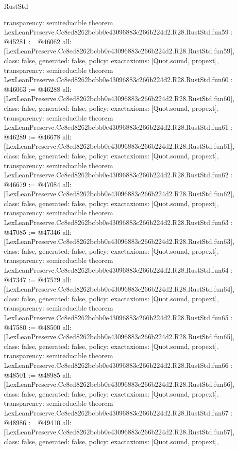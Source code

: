 \begin{lexlean}{RustStd}
\begin{coremodule}
{  transparency: semireducible
}
theorem LexLeanPreserve.Cc8ed8262bcbb0e43096883c266b224d2.R28.RustStd.fun59 : @45281 := @46062 {
  all: [LexLeanPreserve.Cc8ed8262bcbb0e43096883c266b224d2.R28.RustStd.fun59],
  class: false,
  generated: false,
  policy: exact{axioms: [Quot.sound, propext]},
  transparency: semireducible
}
theorem LexLeanPreserve.Cc8ed8262bcbb0e43096883c266b224d2.R28.RustStd.fun60 : @46063 := @46288 {
  all: [LexLeanPreserve.Cc8ed8262bcbb0e43096883c266b224d2.R28.RustStd.fun60],
  class: false,
  generated: false,
  policy: exact{axioms: [Quot.sound, propext]},
  transparency: semireducible
}
theorem LexLeanPreserve.Cc8ed8262bcbb0e43096883c266b224d2.R28.RustStd.fun61 : @46289 := @46678 {
  all: [LexLeanPreserve.Cc8ed8262bcbb0e43096883c266b224d2.R28.RustStd.fun61],
  class: false,
  generated: false,
  policy: exact{axioms: [Quot.sound, propext]},
  transparency: semireducible
}
theorem LexLeanPreserve.Cc8ed8262bcbb0e43096883c266b224d2.R28.RustStd.fun62 : @46679 := @47084 {
  all: [LexLeanPreserve.Cc8ed8262bcbb0e43096883c266b224d2.R28.RustStd.fun62],
  class: false,
  generated: false,
  policy: exact{axioms: [Quot.sound, propext]},
  transparency: semireducible
}
theorem LexLeanPreserve.Cc8ed8262bcbb0e43096883c266b224d2.R28.RustStd.fun63 : @47085 := @47346 {
  all: [LexLeanPreserve.Cc8ed8262bcbb0e43096883c266b224d2.R28.RustStd.fun63],
  class: false,
  generated: false,
  policy: exact{axioms: [Quot.sound, propext]},
  transparency: semireducible
}
theorem LexLeanPreserve.Cc8ed8262bcbb0e43096883c266b224d2.R28.RustStd.fun64 : @47347 := @47579 {
  all: [LexLeanPreserve.Cc8ed8262bcbb0e43096883c266b224d2.R28.RustStd.fun64],
  class: false,
  generated: false,
  policy: exact{axioms: [Quot.sound, propext]},
  transparency: semireducible
}
theorem LexLeanPreserve.Cc8ed8262bcbb0e43096883c266b224d2.R28.RustStd.fun65 : @47580 := @48500 {
  all: [LexLeanPreserve.Cc8ed8262bcbb0e43096883c266b224d2.R28.RustStd.fun65],
  class: false,
  generated: false,
  policy: exact{axioms: [Quot.sound, propext]},
  transparency: semireducible
}
theorem LexLeanPreserve.Cc8ed8262bcbb0e43096883c266b224d2.R28.RustStd.fun66 : @48501 := @48985 {
  all: [LexLeanPreserve.Cc8ed8262bcbb0e43096883c266b224d2.R28.RustStd.fun66],
  class: false,
  generated: false,
  policy: exact{axioms: [Quot.sound, propext]},
  transparency: semireducible
}
theorem LexLeanPreserve.Cc8ed8262bcbb0e43096883c266b224d2.R28.RustStd.fun67 : @48986 := @49410 {
  all: [LexLeanPreserve.Cc8ed8262bcbb0e43096883c266b224d2.R28.RustStd.fun67],
  class: false,
  generated: false,
  policy: exact{axioms: [Quot.sound, propext]},
}
\end{coremodule}
\end{lexlean}
